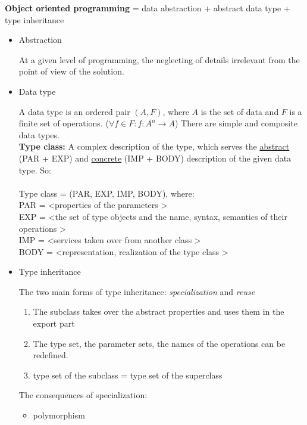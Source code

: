 \documentclass[margin=0px]{article}
\begin{document}
\textbf{Object oriented programming} = data abstraction + abstract data type + type inheritance
\begin{itemize}
    \item Abstraction

          At a given level of programming, the neglecting of details irrelevant from the
          point of view of the solution.

    \item Data type

          A data type is an ordered pair $ (A,F) $, where $ A $ is the set of data and $ F $ is a finite set of operations. ($ \forall f \in F : f:A^n \rightarrow A $) There are simple and composite data types.\\
          \textbf{Type class:} A complex description of the type, which serves the \underline{abstract} (PAR + EXP) and \underline{concrete} (IMP + BODY) description of the given data type. So:\\\\
          Type class = (PAR, EXP, IMP, BODY), where:\\
          PAR = \textless properties of the parameters \textgreater\\
          EXP = \textless the set of type objects and the name, syntax, semantics of their operations \textgreater\\
          IMP = \textless services taken over from another class \textgreater\\
          BODY = \textless representation, realization of the type class \textgreater\\

    \item Type inheritance

          The two main forms of type inheritance: \textit{specialization} and \textit{reuse}
          \begin{enumerate}
              \item The subclass takes over the abstract properties and uses them in the export part
              \item The type set, the parameter sets, the names of the operations can be redefined.
              \item type set of the subclass = type set of the superclass
          \end{enumerate}

          The consequences of specialization:
          \begin{itemize}
              \item polymorphism


\end{itemize}
\end{itemize}
\end{document}
